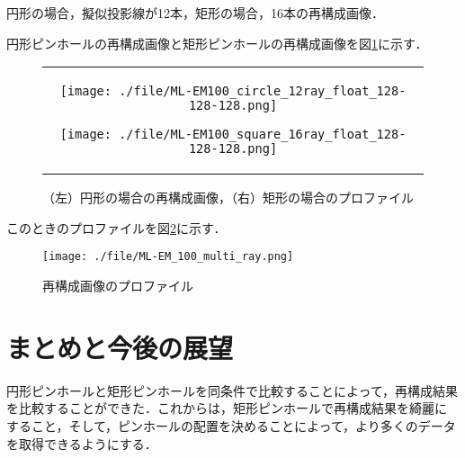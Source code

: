 \documentclass[dvipdfmx,autodetect-engine,twocolumn,10pt]{jsarticle}%
\begin{document}
円形の場合，擬似投影線が12本，矩形の場合，16本の再構成画像．

円形ピンホールの再構成画像と矩形ピンホールの再構成画像を図\ref{reconst_mullti}に示す．
\begin{figure}[htbp]
  \begin{center}
    \begin{tabular}{c}
      \begin{minipage}{0.5\hsize}
        \begin{center}
          \texttt{[image: ./file/ML-EM100\_circle\_12ray\_float\_128-128-128.png]}
        \end{center}
      \end{minipage}
      \begin{minipage}{0.5\hsize}
        \begin{center}
          \texttt{[image: ./file/ML-EM100\_square\_16ray\_float\_128-128-128.png]}
        \end{center}
      \end{minipage}
    \end{tabular}
  \caption{（左）円形の場合の再構成画像，（右）矩形の場合のプロファイル}
  \label{reconst_mullti}
  \end{center}
\end{figure}

\newpage
このときのプロファイルを図\ref{reconst_multi_profile}に示す．
\begin{figure}[htbp]
  \begin{center}
    \texttt{[image: ./file/ML-EM\_100\_multi\_ray.png]}
    \caption{再構成画像のプロファイル}
  \label{reconst_multi_profile}
  \end{center}
\end{figure}


\section{まとめと今後の展望}
円形ピンホールと矩形ピンホールを同条件で比較することによって，再構成結果を比較することができた．これからは，矩形ピンホールで再構成結果を綺麗にすること，そして，ピンホールの配置を決めることによって，より多くのデータを取得できるようにする．
\end{document}
